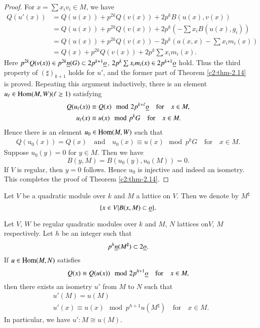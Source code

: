 \begin{proof}
For $x=\sum x_{i}v_{i}\in M$, we have
\begin{align*}
Q(u'(x)) &=Q(u(x))+p^{2k}Q(v(x))+2p^{k}B(u(x),v(x))\\
&= Q(u(x))+p^{2k}Q(v(x))+2p^{k}(-\sum x_{i}B(u(x),g_{i}))\\
&= Q(u(x))+p^{2k}Q(v(x))-2p^{k}(a(x,x)-\sum x_{i}m_{i}(x))\\
&= Q(x)+p^{2k}Q(v(x))+2p^{k}\sum x_{i}m_{i}(x).
\end{align*}\pageoriginale
Here $p^{2k}Q(v(x))\in p^{2k}\underline{n}(G)\subset 2p^{k+1}\underline{o}$,
$2p^{k}\sum x_{i}m_{i}(x)\in 2p^{k+1}\underline{o}$ hold. Thus the third
property of $(\sharp)_{k+1}$ holds for $u'$, and the former part of
Theorem \ref{c2:thm-2.14} is proved. Repeating this argument inductively,
there is an element $u_{\ell}\in\operatorname{Hom}(M,W)(\ell\geq 1)$ satisfying
\begin{align*}
Q(u_{\ell}(x)) &\equiv Q(x)\mod 2p^{k+\ell}\underline{o}\quad\text{for}\quad
x\in M,\\
u_{\ell} (x) &\equiv u(x)\mod p^{k}G\quad\text{for}\quad x\in M. 
\end{align*}
Hence there is an element $u_{0}\in \operatorname{Hom}(M,W)$ such that
\begin{align*}
Q(u_{0}(x))=Q(x)\quad\text{and}\quad u_{0}(x)\equiv u(x)\mod
p^{k}G\quad\text{for}\quad x\in M.
\end{align*}
Suppose $u_{0}(y)=0$ for $y\in M$. Then we have
$$
B(y,M)=B(u_{0}(y),u_{0}(M))=0.
$$
If $V$ is regular, then $y=0$ follows. Hence $u_{0}$ is injective and
indeed an isometry. This completes the proof of Theorem \ref{c2:thm-2.14}.
\end{proof}

\begin{defi*}
Let $V$ be a quadratic module over $k$ and $M$ a lattice on $V$. Then
we denote by $M^{\sharp}$
$$
\{x\in V|B(x,M)\subset \underline{o}\}.
$$
\end{defi*}

\begin{cor}\label{c2:coro-1}
Let $V$, $W$ be regular quadratic modules over $k$ and $M$, $N$
lattices on\pageoriginale $V$, $M$ respectively. Let $h$ be an integer
such that
$$
p^{h}\underline{n}(M^{\sharp})\subset 2\underline{o}.
$$
If $u\in \operatorname{Hom}(M,N)$ satisfies
$$
Q(x)\equiv Q(u(x))\mod 2p^{h+1}\underline{o}\quad\text{for}\quad x\in M,
$$
then there exists an isometry $u'$ from $M$ to $N$ such that
\begin{align*}
& u'(M) = u(M)\\
& u'(x) \equiv u(x)\mod p^{h+1}u(M^{\sharp})\quad\text{for}\quad x\in M.
\end{align*}
In particular, we have $u':M\cong u(M)$.
\end{cor}

